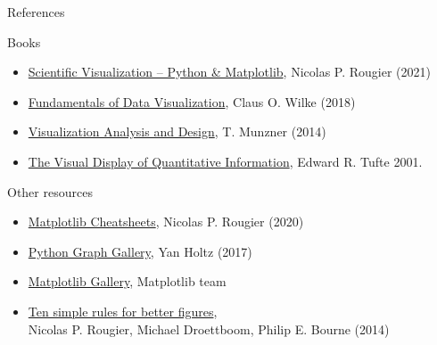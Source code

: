 \documentclass[10pt,aspectratio=169]{beamer}
\begin{document}
  
\begin{frame}{References}

  \begin{block}{Books}
    \vspace{0pt}
    \begin{itemize}
    \item \href{https://github.com/rougier/scientific-visualization-book}{Scientific Visualization – Python \& Matplotlib},
          Nicolas P. Rougier (2021)
    \item \href{https://clauswilke.com/dataviz/}{Fundamentals of Data Visualization},
          Claus O. Wilke (2018)
    \item \href{https://www.cs.ubc.ca/~tmm/vadbook/}{Visualization Analysis and Design}, T. Munzner (2014)
    \item \href{https://www.edwardtufte.com/tufte/}{The Visual Display of Quantitative Information}, Edward R. Tufte 2001.
    \end{itemize}
  \end{block}

  \begin{block}{Other resources}
    \vspace{0pt}
    \begin{itemize}
      \item \href{https://github.com/matplotlib/cheatsheets}{Matplotlib Cheatsheets}, Nicolas P. Rougier (2020)
      \item \href{https://www.python-graph-gallery.com/}{Python Graph Gallery}, Yan Holtz (2017)
      \item \href{https://matplotlib.org/stable/gallery/index.html}{Matplotlib Gallery}, Matplotlib team
      \item \href{https://journals.plos.org/ploscompbiol/article?id=10.1371/journal.pcbi.1003833}{Ten simple rules for better figures},\\
            Nicolas P. Rougier, Michael Droettboom, Philip E. Bourne (2014)
    \end{itemize}
  \end{block}
    
\end{frame}
\end{document}

